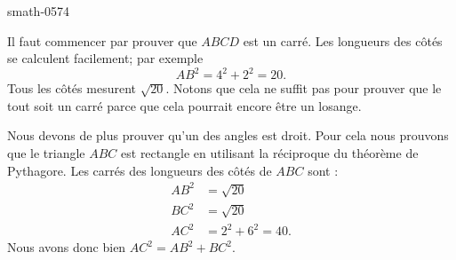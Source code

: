 
\begin{corrige}{smath-0574}

    Il faut commencer par prouver que \( ABCD\) est un carré. Les longueurs des côtés se calculent facilement; par exemple
    \begin{equation}
        AB^2=4^2+2^2=20.
    \end{equation}
    Tous les côtés mesurent \( \sqrt{20}\). Notons que cela ne suffit pas pour prouver que le tout soit un carré parce que cela pourrait encore être un losange. 
    
    Nous devons de plus prouver qu'un des angles est droit. Pour cela nous prouvons que le triangle \( ABC\) est rectangle en utilisant la réciproque du théorème de Pythagore. Les carrés des longueurs des côtés de \( ABC\) sont :
    \begin{subequations}
        \begin{align}
            AB^2&=\sqrt{20}\\
            BC^2&=\sqrt{20}\\
            AC^2&=2^2+6^2=40.
        \end{align}
    \end{subequations}
    Nous avons donc bien \( AC^2=AB^2+BC^2\).

\end{corrige}

